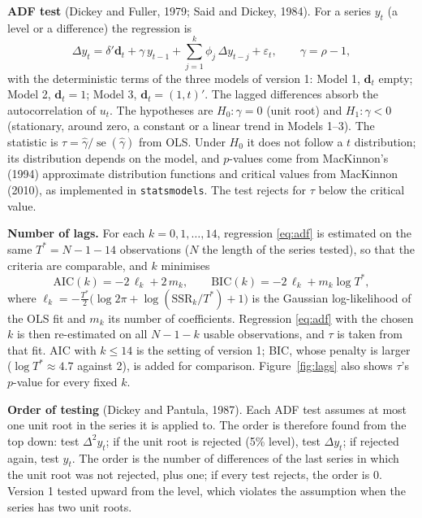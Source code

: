 \documentclass[11pt,a4paper]{article}
\begin{document}
\textbf{ADF test} (Dickey and Fuller, 1979; Said and Dickey, 1984). For a series $y_t$ (a level or a difference) the regression is
\begin{equation}
\Delta y_t = \delta' \mathbf{d}_t + \gamma\, y_{t-1} + \sum_{j=1}^{k} \phi_j\, \Delta y_{t-j} + \varepsilon_t, \qquad
\gamma = \rho - 1, \label{eq:adf}
\end{equation}
with the deterministic terms of the three models of version 1: Model 1, $\mathbf{d}_t$ empty; Model 2, $\mathbf{d}_t = 1$; Model 3,
$\mathbf{d}_t = (1, t)'$. The lagged differences absorb the autocorrelation of $u_t$. The hypotheses are $H_0\colon \gamma = 0$ (unit
root) and $H_1\colon \gamma < 0$ (stationary, around zero, a constant or a linear trend in Models 1--3). The statistic is
$\tau = \hat\gamma / \operatorname{se}(\hat\gamma)$ from OLS. Under $H_0$ it does not follow a $t$ distribution; its distribution
depends on the model, and $p$-values come from MacKinnon's (1994) approximate distribution functions and critical values from
MacKinnon (2010), as implemented in \texttt{statsmodels}. The test rejects for $\tau$ below the critical value.

\textbf{Number of lags.} For each $k = 0, 1, \dots, 14$, regression \eqref{eq:adf} is estimated on the same $T^\ast = N - 1 - 14$
observations ($N$ the length of the series tested), so that the criteria are comparable, and $k$ minimises
\begin{equation}
\mathrm{AIC}(k) = -2\,\ell_k + 2\,m_k, \qquad \mathrm{BIC}(k) = -2\,\ell_k + m_k \log T^\ast, \label{eq:ic}
\end{equation}
where $\ell_k = -\tfrac{T^\ast}{2}\bigl(\log 2\pi + \log(\mathrm{SSR}_k / T^\ast) + 1\bigr)$ is the Gaussian log-likelihood of the
OLS fit and $m_k$ its number of coefficients. Regression \eqref{eq:adf} with the chosen $k$ is then re-estimated on all
$N - 1 - k$ usable observations, and $\tau$ is taken from that fit. AIC with $k \le 14$ is the setting of version 1; BIC, whose
penalty is larger ($\log T^\ast \approx 4.7$ against 2), is added for comparison. Figure~\ref{fig:lags} also shows $\tau$'s $p$-value
for every fixed $k$.

\textbf{Order of testing} (Dickey and Pantula, 1987). Each ADF test assumes at most one unit root in the series it is applied to.
The order is therefore found from the top down: test $\Delta^2 y_t$; if the unit root is rejected (5\% level), test $\Delta y_t$; if
rejected again, test $y_t$. The order is the number of differences of the last series in which the unit root was not rejected, plus
one; if every test rejects, the order is 0. Version 1 tested upward from the level, which violates the assumption when the series
has two unit roots.
\end{document}
